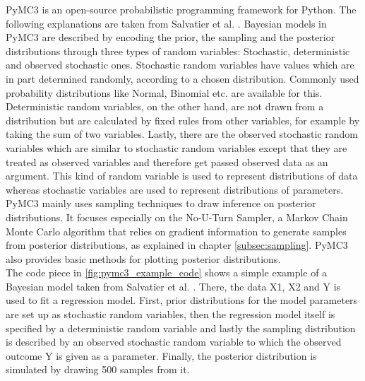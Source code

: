\documentclass{article}
\begin{document}
PyMC3 is an open-source probabilistic programming framework for Python. The following explanations are taken from Salvatier et al. \cite{Salvatier2016}. Bayesian models in PyMC3 are described by encoding the prior, the sampling and the posterior distributions through three types of random variables: Stochastic, deterministic and observed stochastic ones. Stochastic random variables have values which are in part determined randomly, according to a chosen distribution. Commonly used probability distributions like Normal, Binomial etc. are available for this. Deterministic random variables, on the other hand, are not drawn from a distribution but are calculated by fixed rules from other variables, for example by taking the sum of two variables. Lastly, there are the observed stochastic random variables which are similar to stochastic random variables except that they are treated as observed variables and therefore get passed observed data as an argument. This kind of random variable is used to represent distributions of data whereas stochastic variables are used to represent distributions of parameters.
\\
PyMC3 mainly uses sampling techniques to draw inference on posterior distributions. It focuses especially on the No-U-Turn Sampler, a Markov Chain Monte Carlo algorithm that relies on gradient information to generate samples from posterior distributions, as explained in chapter \ref{subsec:sampling}. PyMC3 also provides basic methods for plotting posterior distributions.
\\
The code piece  in \ref{fig:pymc3_example_code} shows a simple example of a Bayesian model taken from Salvatier et al. \cite{Salvatier2016}. There, the data X1, X2 and Y is used to fit a regression model. First, prior distributions for the model parameters are set up as stochastic random variables, then the regression model itself is specified by a deterministic random variable and lastly the sampling distribution is described by an observed stochastic random variable to which the observed outcome Y is given as a parameter. Finally, the posterior distribution is simulated by drawing 500 samples from it.
\end{document}
